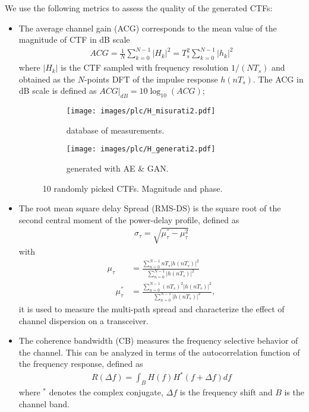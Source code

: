 We use the following metrics to assess the quality of the generated CTFs:
\begin{itemize}
    \item The average channel gain (ACG) corresponds to the mean value of the magnitude of CTF in dB scale
\begin{align}
ACG=\frac{1}{N} \sum\limits_{k=0}^{N-1} |H_k|^2 = T_s^2 \sum\limits_{k=0}^{N-1} |h_k|^2 
\label{eq:plc_acg}
\end{align}
where $|H_k|$ is the CTF sampled with frequency resolution $1/(NT_s)$ and obtained as the $N$-points DFT of the impulse response $h(n
T_s)$. The ACG in dB scale is defined as $ACG|_{dB}=10\log_{10}(ACG)$;

\begin{figure}
\centering
\begin{subfigure}{0.5\textwidth}
  \centering
 \texttt{[image: images/plc/H\_misurati2.pdf]}
	\caption{database of measurements.}
	\label{fig:plc_H_measured}
\end{subfigure}%
\begin{subfigure}{0.5\textwidth}
  \centering
 \texttt{[image: images/plc/H\_generati2.pdf]}
	\caption{generated with AE \& GAN.}
	\label{fig:plc_H_generated}
\end{subfigure}
\caption{10 randomly picked CTFs. Magnitude and phase.}
\label{fig:plc_CTFs}
\end{figure}

\item The root mean square delay Spread (RMS-DS) is the square root of the second central moment of the power-delay profile, defined as
\begin{align}
\sigma_\tau = \sqrt{\mu_\tau^{''} - \mu_\tau^2}
\label{eq:plc_mu0}
\end{align}
with 
\begin{align}
\mu_\tau &= \frac{ \sum\limits_{n=0}^{N-1} nT_s|h(nT_s)|^2}{\sum\limits_{n=0}^{N-1} |h(nT_s)|^2}  \\
\quad
\mu_\tau^{''}
&= \frac{ \sum\limits_{n=0}^{N-1} (nT_s)^2 |h(nT_s)|^2}{\sum\limits_{n=0}^{N-1} |h(nT_s)|^2},
\label{eq:plc_mu1}
\end{align}
it is used to measure the multi-path spread and characterize the effect of channel dispersion on a transceiver. 

\item The coherence bandwidth (CB) measures the frequency selective behavior of the channel. This can be analyzed in terms of the autocorrelation function of the frequency response, defined as 
\begin{align}
R(\Delta f)=\int_{B}^{} H(f)H^*(f+\Delta f)df
\label{eq:plc_Rdf}
\end{align}
where $^*$ denotes the complex conjugate, $\Delta f$ is the frequency shift and $B$ is the channel band.
\end{itemize}

